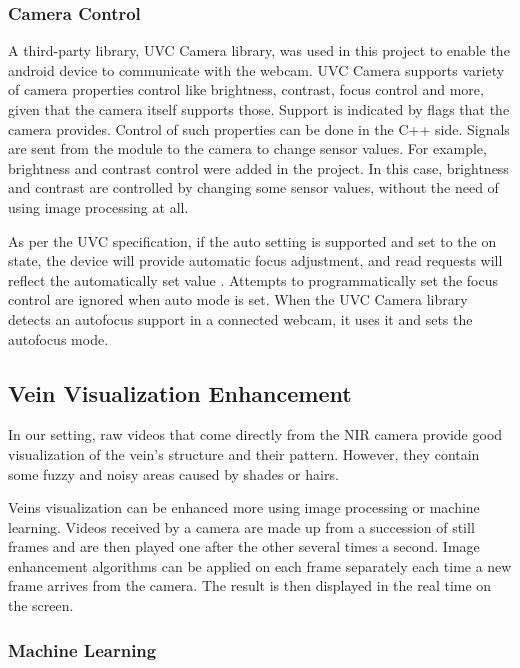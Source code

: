 \subsubsection{Camera Control}

A third-party library, UVC Camera library, was used in this project to enable the android device to communicate with the webcam. UVC Camera supports variety of camera properties control like brightness, contrast, focus control and more, given that the camera itself supports those. Support is indicated by flags that the camera provides. Control of such properties can be done in the C++ side. Signals are sent from the module to the camera to change sensor values. For example, brightness and contrast control were added in the project. In this case, brightness and contrast are controlled by changing some sensor values, without the need of using image processing at all.


As per the UVC specification, if the auto setting is supported and set to the on state, the device will provide automatic focus adjustment, and read requests will reflect the automatically set value \parencite{uvcCamera}. Attempts to programmatically set the focus control are ignored when auto mode is set. When the UVC Camera library detects an autofocus support in a connected webcam, it uses it and sets the autofocus mode.



\subsection{Vein Visualization Enhancement}

In our setting, raw videos that come directly from the NIR camera provide good visualization of the vein’s structure and their pattern. However, they contain some fuzzy and noisy areas caused by shades or hairs.

Veins visualization can be enhanced more using image processing or machine learning.
Videos received by a camera are made up from a succession of still frames and are then played one after the other several times a second. Image enhancement algorithms can be applied on each frame separately each time a new frame arrives from the camera. The result is then displayed in the real time on the screen.

\subsubsection{Machine Learning}

